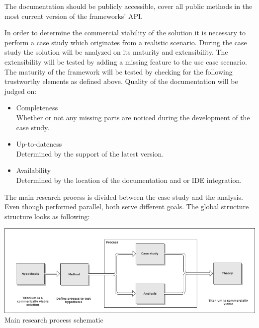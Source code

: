 The documentation should be publicly accessible, cover all public methods in the most current version of the frameworks' API.

%
%

In order to determine the commercial viability of the solution it is necessary to perform a case study which originates from a realistic scenario. During the case study the solution will be analyzed on its maturity and extensibility.  The extensibility will be tested by adding a missing feature to the use case scenario. The maturity of the framework will be tested by checking for the following trustworthy elements as defined above. Quality of the documentation will be judged on:
\begin{itemize}
	\item Completeness\\
	Whether or not any missing parts are noticed during the development of the case study.
	\item Up-to-dateness\\
	Determined by the support of the latest version.
	\item Availability\\
	Determined by the location of the documentation and or IDE integration.
\end{itemize}

\noindent The main research process is divided between the case study and the analysis. Even though performed parallel, both serve different goals. The global structure structure looks as following:
\begin{centering}
\includegraphics[scale=0.5]{images/process.png}\\{Main research process schematic}\\
\end{centering}

